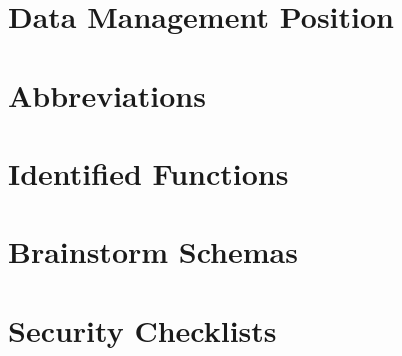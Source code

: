 \documentclass[a4paper]{report}
\begin{document}
	
	
	
	
	
	
	\chapter{Data Management Position}
	\label{position}
	
	
	
	
	
	
	
	
	
	\clearpage
	
	
	\appendix
	\chapter{Abbreviations}
	\label{abbreviations}
	
	
	
	\chapter{Identified Functions}
	\label{identified-functions}
	
	
	
	\chapter{Brainstorm Schemas}
	\label{brainstorm-before-after}
	
	
	
	\chapter{Security Checklists}
	\label{security-appendix}
	
	
\end{document}
